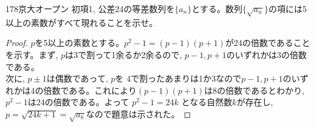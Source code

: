 \begin{prob}{178}{}{京大オープン}
 初項1, 公差24の等差数列を$\{a_n\}$とする。数列$\{\sqrt{a_n}\}$の項には5以上の素数がすべて現れることを示せ。
\end{prob}
\begin{proof}

$p$を5以上の素数とする。$p^2-1=(p-1)(p+1)$が24の倍数であることを示す。まず, $p$は3で割って1余るか2余るので, $p-1,p+1$のいずれかは3の倍数である。\\
次に, $p\pm 1$は偶数であって, $p$を
4で割ったあまりは1か3なので$p-1,p+1$のいずれかは4の倍数である。これにより$(p-1)(p+1)$は8の倍数であるとわかり, $p^2-1$は24の倍数である。よって $p^2-1=24k$  となる自然数$k$が存在し,  $p=\sqrt{24k+1}=\sqrt{a_k}$なので題意は示された。


\end{proof}
